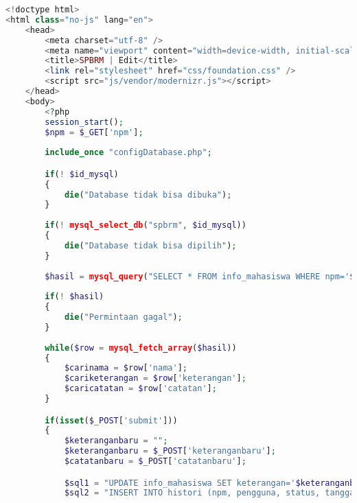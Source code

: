 \begin{lstlisting}[language=php,basicstyle=\tiny,caption=edit.php]
<!doctype html>
<html class="no-js" lang="en">
	<head>
		<meta charset="utf-8" />
		<meta name="viewport" content="width=device-width, initial-scale=1.0" />
		<title>SPBRM | Edit</title>
		<link rel="stylesheet" href="css/foundation.css" />
		<script src="js/vendor/modernizr.js"></script>
	</head>
	<body>
		<?php
		session_start();
		$npm = $_GET['npm'];
		
		include_once "configDatabase.php";

		if(! $id_mysql)
		{
			die("Database tidak bisa dibuka");
		}
			
		if(! mysql_select_db("spbrm", $id_mysql))
		{
			die("Database tidak bisa dipilih");
		}
			
		$hasil = mysql_query("SELECT * FROM info_mahasiswa WHERE npm='$npm'", $id_mysql);
		
		if(! $hasil)
		{
			die("Permintaan gagal");
		}
		
		while($row = mysql_fetch_array($hasil))
		{
			$carinama = $row['nama'];
			$cariketerangan = $row['keterangan'];
			$caricatatan = $row['catatan'];
		}

		if(isset($_POST['submit']))
		{
			$keteranganbaru = "";
			$keteranganbaru = $_POST['keteranganbaru'];
			$catatanbaru = $_POST['catatanbaru'];

			$sql1 = "UPDATE info_mahasiswa SET keterangan='$keteranganbaru', catatan='$catatanbaru', pembaruan_terakhir=now() WHERE npm='$npm'";
			$sql2 = "INSERT INTO histori (npm, pengguna, status, tanggal_pembaruan, keterangan, catatan) VALUES ('". mysql_real_escape_string($npm)  ."', '".$_SESSION['email']."', 'mengedit', now(), '". mysql_real_escape_string($keteranganbaru)  ."', '". mysql_real_escape_string($catatanbaru)  ."')";
			

\end{lstlisting}
